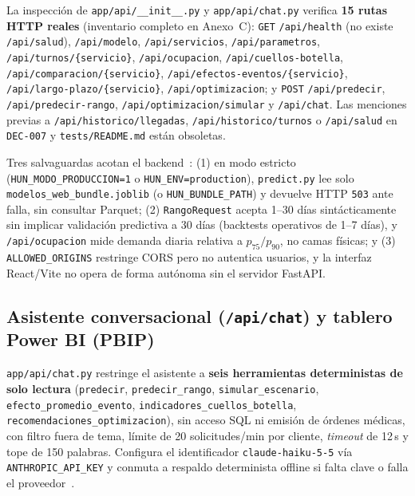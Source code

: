 La inspección de \texttt{app/api/\_\_init\_\_.py} y \texttt{app/api/chat.py} verifica \textbf{15 rutas HTTP reales} (inventario completo en Anexo~C): \texttt{GET} \texttt{/api/health} (no existe \texttt{/api/salud}), \texttt{/api/modelo}, \texttt{/api/servicios}, \texttt{/api/parametros}, \texttt{/api/turnos/\{servicio\}}, \texttt{/api/ocupacion}, \texttt{/api/cuellos-botella}, \texttt{/api/\allowbreak comparacion/\allowbreak \{servicio\}}, \texttt{/api/\allowbreak efectos-eventos/\allowbreak \{servicio\}}, \texttt{/api/\allowbreak largo-plazo/\allowbreak \{servicio\}}, \texttt{/api/optimizacion}; y \texttt{POST} \texttt{/api/predecir}, \texttt{/api/predecir-rango}, \texttt{/api/optimizacion/simular} y \texttt{/api/chat}. Las menciones previas a \texttt{/api/historico/llegadas}, \texttt{/api/historico/turnos} o \texttt{/api/salud} en \texttt{DEC-007} y \texttt{tests/README.md} están obsoletas.

Tres salvaguardas acotan el backend~\cite{mediflow2026auditoria}: (1) en modo estricto (\texttt{HUN\_MODO\_PRODUCCION=1} o \texttt{HUN\_ENV=production}), \texttt{predict.py} lee solo \texttt{modelos\_web\_bundle.joblib} (o \texttt{HUN\_BUNDLE\_PATH}) y devuelve HTTP \texttt{503} ante falla, sin consultar Parquet; (2) \texttt{RangoRequest} acepta 1--30 días sintácticamente sin implicar validación predictiva a 30 días (backtests operativos de 1--7 días), y \texttt{/api/ocupacion} mide demanda diaria relativa a $p_{75}/p_{90}$, no camas físicas; y (3) \texttt{ALLOWED\_ORIGINS} restringe CORS pero no autentica usuarios, y la interfaz React/Vite no opera de forma autónoma sin el servidor FastAPI.

\subsection{Asistente conversacional (\texttt{/api/chat}) y tablero Power BI (PBIP)}

\texttt{app/api/chat.py} restringe el asistente a \textbf{seis herramientas deterministas de solo lectura} (\texttt{predecir}, \texttt{predecir\_rango}, \texttt{simular\_escenario}, \texttt{efecto\_promedio\_evento}, \texttt{indicadores\_\allowbreak cuellos\_\allowbreak botella}, \texttt{recomendaciones\_\allowbreak optimizacion}), sin acceso SQL ni emisión de órdenes médicas, con filtro fuera de tema, límite de 20 solicitudes/min por cliente, \textit{timeout} de 12\,s y tope de 150 palabras. Configura el identificador \texttt{claude-haiku-5-5} vía \texttt{ANTHROPIC\_API\_KEY} y conmuta a respaldo determinista offline si falta clave o falla el proveedor~\cite{mediflow2026informe}.

